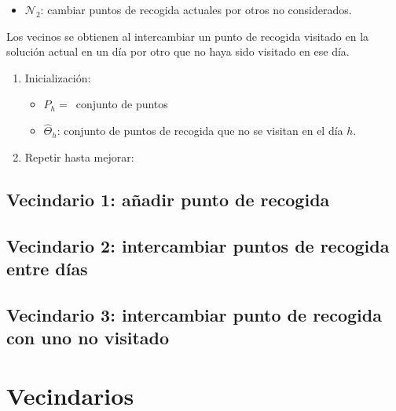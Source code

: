 \documentclass[
]{article}
\providecommand{\tightlist}{%
  \setlength{\itemsep}{0pt}\setlength{\parskip}{0pt}}
\begin{document}
\begin{itemize}
\tightlist
\item
  \(\mathcal{N}_2\): cambiar puntos de recogida actuales por otros no
  considerados.
\end{itemize}

Los vecinos se obtienen al intercambiar un punto de recogida visitado en
la solución actual en un día por otro que no haya sido visitado en ese
día.

\begin{enumerate}
\def\labelenumi{\arabic{enumi}.}
\tightlist
\item
  Inicialización:

  \begin{itemize}
  \tightlist
  \item
    \(P_h=\,\) conjunto de puntos
  \item
    \(\hat{\Theta}_h\): conjunto de puntos de recogida que no se visitan
    en el día \(h\).
  \end{itemize}
\item
  Repetir hasta mejorar:
\end{enumerate}

\hypertarget{vecindario-1-auxf1adir-punto-de-recogida}{%
\subsection{Vecindario 1: añadir punto de
recogida}\label{vecindario-1-auxf1adir-punto-de-recogida}}

\hypertarget{vecindario-2-intercambiar-puntos-de-recogida-entre-duxedas}{%
\subsection{Vecindario 2: intercambiar puntos de recogida entre
días}\label{vecindario-2-intercambiar-puntos-de-recogida-entre-duxedas}}

\hypertarget{vecindario-3-intercambiar-punto-de-recogida-con-uno-no-visitado}{%
\subsection{Vecindario 3: intercambiar punto de recogida con uno no
visitado}\label{vecindario-3-intercambiar-punto-de-recogida-con-uno-no-visitado}}

\hypertarget{vecindarios}{%
\section{Vecindarios}\label{vecindarios}}
\end{document}
